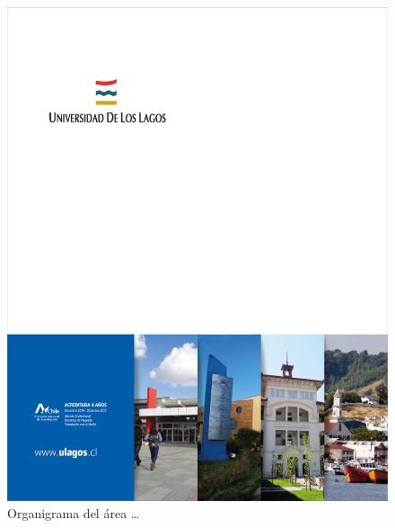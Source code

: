 \documentclass[letter,12pt]{report}
\begin{document}
\blindtext %


\begin{figure}[H]
\centering
 \includegraphics[scale=0.1]{portada}
  \caption{Organigrama del área \dots}
\end{figure}
\end{document}
